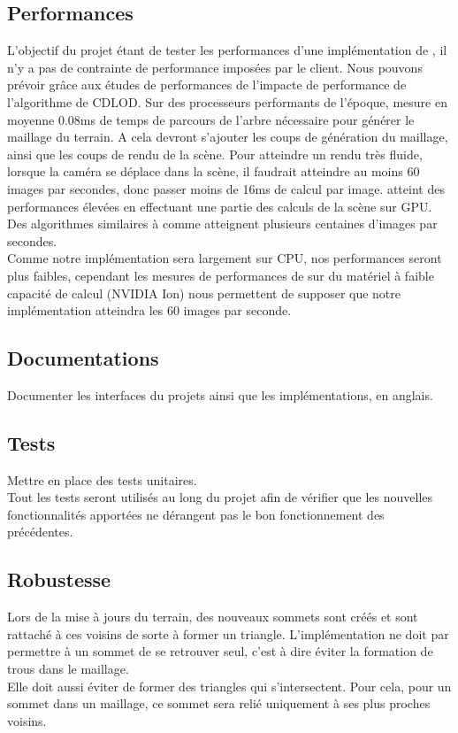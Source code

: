 \documentclass[12pt]{report}
\begin{document}
\subsection{Performances}

L'objectif du projet étant de tester les performances d'une
implémentation de \cite{CDLOD}, il n'y a pas de contrainte de
performance imposées par le client. Nous pouvons prévoir grâce aux
études de performances de \cite{CDLOD} l'impacte de performance de
l'algorithme de CDLOD. Sur des processeurs performants de l'époque,
\cite{CDLOD} mesure en moyenne 0.08ms de temps de parcours de l'arbre
nécessaire pour générer le maillage du terrain. A cela devront s'ajouter
les coups de génération du maillage, ainsi que les coups de rendu de la
scène.  Pour atteindre un rendu très fluide, lorsque la caméra se
déplace dans la scène, il faudrait atteindre au moins 60 images par
secondes, donc passer moins de 16ms de calcul par image. \cite{CDLOD}
atteint des performances élevées en effectuant une partie des calculs de
la scène sur GPU.  Des algorithmes similaires à \cite{CDLOD} comme
\cite{PlanetRenderer} atteignent plusieurs centaines d'images par
secondes.\\
Comme notre implémentation sera largement sur CPU, nos
performances seront plus faibles, cependant les mesures de performances
de \cite{CDLOD} sur du matériel à faible capacité de calcul (NVIDIA Ion)
nous permettent de supposer que notre implémentation atteindra les 60
images par seconde.

\subsection{Documentations}

Documenter les interfaces du projets ainsi que les implémentations, en
anglais.\\

\subsection{Tests}

Mettre en place des tests unitaires.\\
Tout les tests seront utilisés au long du projet afin de vérifier que
les nouvelles fonctionnalités apportées ne dérangent pas le bon
fonctionnement des précédentes.

\subsection{Robustesse}
Lors de la mise à jours du terrain, des nouveaux sommets sont créés et
sont rattaché à ces voisins de sorte à former un triangle.
L'implémentation ne doit par permettre à un sommet de se retrouver seul,
c'est à dire éviter la formation de trous dans le maillage.\\
Elle doit aussi éviter de former des triangles qui s'intersectent.  Pour
cela, pour un sommet dans un maillage, ce sommet sera relié uniquement à
ses plus proches voisins.
\end{document}
